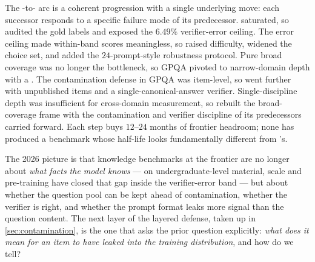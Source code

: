 The -to- arc is a coherent progression with a single underlying
move: each successor responds to a specific failure mode of its
predecessor.  saturated, so  audited the gold labels
and exposed the $6.49\%$ verifier-error ceiling. The error ceiling
made within-band scores meaningless, so  raised difficulty,
widened the choice set, and added the $24$-prompt-style robustness
protocol. Pure broad coverage was no longer the bottleneck, so GPQA
pivoted to narrow-domain depth with a . The
contamination defense in GPQA was item-level, so  went
further with unpublished items and a single-canonical-answer verifier.
Single-discipline depth was insufficient for cross-domain measurement,
so  rebuilt the broad-coverage frame with the contamination and
verifier discipline of its predecessors carried forward. Each step
buys $12$--$24$ months of frontier headroom; none has produced a
benchmark whose half-life looks fundamentally different from 's.

The 2026 picture is that knowledge benchmarks at the frontier
are no longer about \emph{what facts the model knows} --- on
undergraduate-level material, scale and pre-training have closed
that gap inside the verifier-error band --- but about whether the
question pool can be kept ahead of contamination, whether the verifier
is right, and whether the prompt format leaks more signal than the
question content. The next layer of the layered defense, taken up in
\cref{sec:contamination}, is the one that asks the prior question
explicitly: \emph{what does it mean for an item to have leaked into
the training distribution}, and how do we tell?

